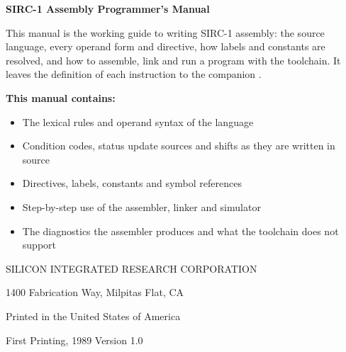 \clearpage
\thispagestyle{empty}
\begin{center}

	\vspace*{1.5cm}

	{\Large\bfseries SIRC-1 Assembly Programmer's Manual}

	\vspace{1cm}

	\begin{minipage}{0.8\textwidth}
		This manual is the working guide to writing SIRC-1 assembly: the source language, every operand form and directive,
		how labels and constants are resolved, and how to assemble, link and run a program with the toolchain. It leaves the
		definition of each instruction to the companion \archmanual{}.

		\vspace{0.6cm}

		\textbf{This manual contains:}
		\begin{itemize}
			\item The lexical rules and operand syntax of the language
			\item Condition codes, status update sources and shifts as they are written in source
			\item Directives, labels, constants and symbol references
			\item Step-by-step use of the assembler, linker and simulator
			\item The diagnostics the assembler produces and what the toolchain does not support
		\end{itemize}
	\end{minipage}

	\vfill

	{\small SILICON INTEGRATED RESEARCH CORPORATION}

	{\small 1400 Fabrication Way, Milpitas Flat, CA}

	{\small Printed in the United States of America}

	\vspace{0.4cm}

	{\small First Printing, 1989 \quad\textbullet\quad Version 1.0}

\end{center}
